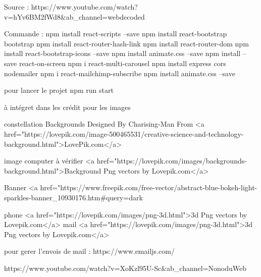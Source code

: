 Source :
https://www.youtube.com/watch?v=hYv6BM2fWd8&ab_channel=webdecoded

Commande :
npm install react-scripts --save
npm install react-bootstrap bootstrap
npm install react-router-hash-link  
npm install react-router-dom 
npm install react-bootstrap-icons --save
npm install animate.css --save
npm install --save react-on-screen
npm i react-multi-carousel
npm install express cors nodemailer
npm i react-mailchimp-subscribe
npm install animate.css --save

pour lancer le projet 
npm run start

à intégret dans les crédit pour les images

constellation
Backgrounds Designed By Charising-Man From <a href="https://lovepik.com/image-500465531/creative-science-and-technology-background.html">LovePik.com</a>

image computer à vérifier
<a href="https://lovepik.com/images/backgrounds-background.html">Background Png vectors by Lovepik.com</a>

Banner
<a href="https://www.freepik.com/free-vector/abstract-blue-bokeh-light-sparkles-banner_10930176.htm#query=dark%

phone
<a href="https://lovepik.com/images/png-3d.html">3d Png vectors by Lovepik.com</a>
mail
<a href="https://lovepik.com/images/png-3d.html">3d Png vectors by Lovepik.com</a>


pour gerer l'envois de mail : https://www.emailjs.com/

https://www.youtube.com/watch?v=XoKzl95U-Sc&ab_channel=NonoduWeb
